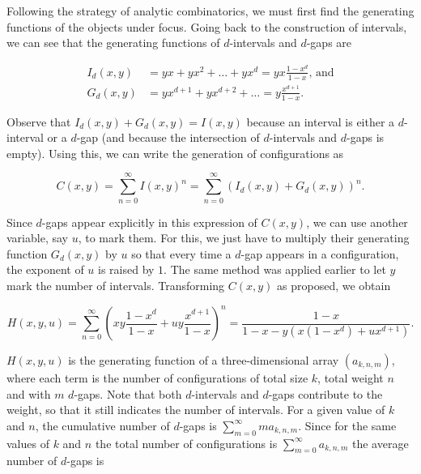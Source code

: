 \documentclass{article}
\begin{document}
Following the strategy of analytic combinatorics, we must first find the
generating functions of the objects under focus. Going back to the
construction of intervals, we can see that the generating functions of
$d$-intervals and $d$-gaps are

\begin{equation*}
\begin{split}
I_d(x,y) &= yx + yx^2 + \ldots + yx^d = yx\frac{1-x^d}{1-x}\text{, and} \\
G_d(x,y) &= yx^{d+1} + yx^{d+2} + \ldots = y\frac{x^{d+1}}{1-x}.
\end{split}
\end{equation*}

Observe that $I_d(x,y)+G_d(x,y) = I(x,y)$ because an interval is either a
$d$-interval or a $d$-gap (and because the intersection of $d$-intervals
and $d$-gaps is empty). Using this, we can write the generation of
configurations as

\begin{equation}
\label{eq:C2ndform}
C(x,y) = \sum_{n=0}^\infty I(x,y)^n
= \sum_{n=0}^\infty \left( I_d(x,y) + G_d(x,y) \right)^n.
\end{equation}

Since $d$-gaps appear explicitly in this expression of $C(x,y)$, we can
use another variable, say $u$, to mark them. For this, we just have to
multiply their generating function $G_d(x,y)$ by $u$ so that every time a
$d$-gap appears in a configuration, the exponent of $u$ is raised by $1$.
The same method was applied earlier to let $y$ mark the number of
intervals. Transforming $C(x,y)$ as proposed, we obtain


\begin{equation*}
H(x,y,u) = \sum_{n=0}^\infty \left(xy\frac{1-x^d}{1-x} +
uy\frac{x^{d+1}}{1-x}\right)^n
= \frac{1-x}{1-x-y\left(x(1-x^d) +ux^{d+1}\right)}.
\end{equation*}

$H(x,y,u)$ is the generating function of a three-dimensional array
$(a_{k,n,m})$, where each term is the number of configurations of total
size $k$, total weight $n$ and with $m$ $d$-gaps. Note that both
$d$-intervals and $d$-gaps contribute to the weight, so that it still
indicates the number of intervals. For a given value of $k$ and $n$, the
cumulative number of $d$-gaps is $\sum_{m=0}^\infty ma_{k,n,m}$. Since for
the same values of $k$ and $n$ the total number of configurations is
$\sum_{m=0}^\infty a_{k,n,m}$ the average number of $d$-gaps is
\end{document}
